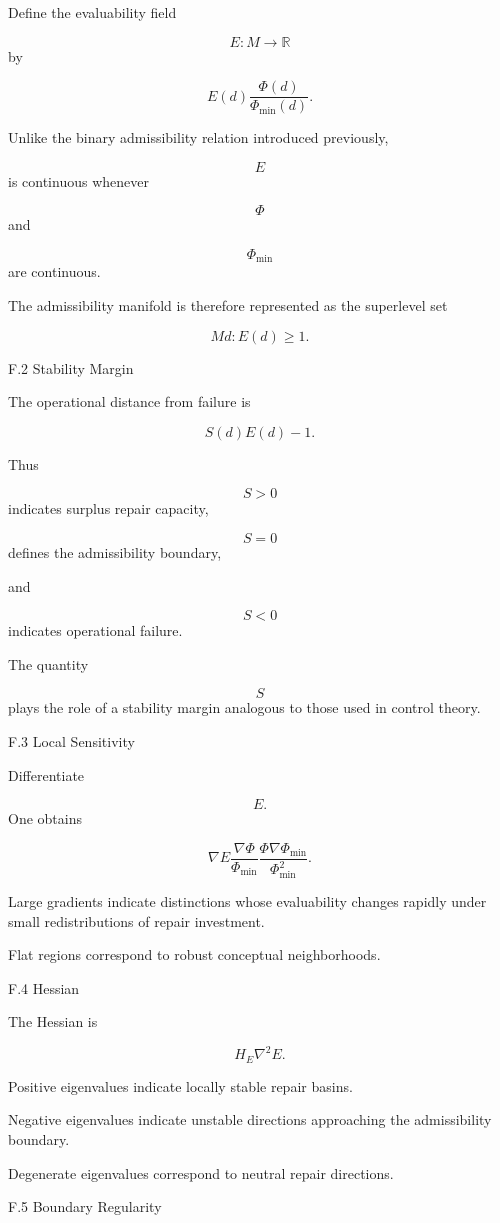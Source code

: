 \documentclass[12pt,oneside]{article}
\theoremstyle{plain}
\theoremstyle{definition}
\theoremstyle{remark}
\begin{document}
Define the evaluability field

\[
E:M\rightarrow\mathbb R
\]
by

\[
E(d)
\frac{\Phi(d)}
{\Phi_{\min}(d)}.
\]

Unlike the binary admissibility relation introduced previously,

\[
E
\]
is continuous whenever

\[
\Phi
\]
and

\[
\Phi_{\min}
\]
are continuous.

The admissibility manifold is therefore represented as the superlevel set

\[
M
{
d:
E(d)\ge1
}.
\]


F.2 Stability Margin

The operational distance from failure is

\[
S(d)
E(d)-1.
\]

Thus

\[
S>0
\]
indicates surplus repair capacity,

\[
S=0
\]
defines the admissibility boundary,

and

\[
S<0
\]
indicates operational failure.

The quantity

\[
S
\]
plays the role of a stability margin analogous to those used in control theory.


F.3 Local Sensitivity

Differentiate

\[
E.
\]
One obtains

\[
\nabla E
\frac{
\nabla\Phi
}
{
\Phi_{\min}
}

\frac{
\Phi
\nabla\Phi_{\min}
}
{
\Phi_{\min}^2
}.
\]

Large gradients indicate distinctions whose evaluability changes rapidly under small redistributions of repair investment.

Flat regions correspond to robust conceptual neighborhoods.


F.4 Hessian

The Hessian is

\[
H_E
\nabla^2E.
\]

Positive eigenvalues indicate locally stable repair basins.

Negative eigenvalues indicate unstable directions approaching the admissibility boundary.

Degenerate eigenvalues correspond to neutral repair directions.


F.5 Boundary Regularity
\end{document}
